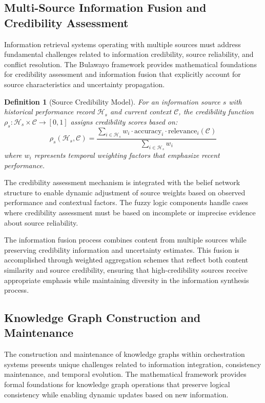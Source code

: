 \documentclass[12pt,a4paper]{article}
\newtheorem{definition}[theorem]{Definition}
\begin{document}
\subsection{Multi-Source Information Fusion and Credibility Assessment}

Information retrieval systems operating with multiple sources must address fundamental challenges related to information credibility, source reliability, and conflict resolution. The Bulawayo framework provides mathematical foundations for credibility assessment and information fusion that explicitly account for source characteristics and uncertainty propagation.

\begin{definition}[Source Credibility Model]
For an information source $s$ with historical performance record $\mathcal{H}_s$ and current context $\mathcal{C}$, the credibility function $\rho_s : \mathcal{H}_s \times \mathcal{C} \rightarrow [0,1]$ assigns credibility scores based on:
\begin{equation}
\rho_s(\mathcal{H}_s, \mathcal{C}) = \frac{\sum_{i \in \mathcal{H}_s} w_i \cdot \text{accuracy}_i \cdot \text{relevance}_i(\mathcal{C})}{\sum_{i \in \mathcal{H}_s} w_i}
\end{equation}
where $w_i$ represents temporal weighting factors that emphasize recent performance.
\end{definition}

The credibility assessment mechanism is integrated with the belief network structure to enable dynamic adjustment of source weights based on observed performance and contextual factors. The fuzzy logic components handle cases where credibility assessment must be based on incomplete or imprecise evidence about source reliability.

The information fusion process combines content from multiple sources while preserving credibility information and uncertainty estimates. This fusion is accomplished through weighted aggregation schemes that reflect both content similarity and source credibility, ensuring that high-credibility sources receive appropriate emphasis while maintaining diversity in the information synthesis process.

\subsection{Knowledge Graph Construction and Maintenance}

The construction and maintenance of knowledge graphs within orchestration systems presents unique challenges related to information integration, consistency maintenance, and temporal evolution. The mathematical framework provides formal foundations for knowledge graph operations that preserve logical consistency while enabling dynamic updates based on new information.
\end{document}
